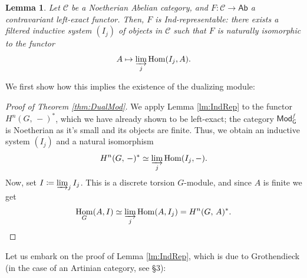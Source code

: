 \documentclass[a4paper, oneside]{memoir}
\def\Gfmod{\mathsf{Mod}_{\mathsf{G}}^f}
\def\Ab{\mathsf{Ab}}
\renewcommand{\H}[3]{H^{#1}( #2, \, #3 )}
\DeclareMathOperator{\Hom}{Hom}
\theoremstyle{plain}
\newtheorem{lemma}[theorem]{Lemma}
\theoremstyle{definition}
\theoremstyle{remark}
\begin{document}
\begin{lemma}\label{lm:IndRep}
    Let \(\mathcal{C}\) be a Noetherian Abelian category, and \(F: \mathcal{C}\to\Ab\) a contravariant left-exact functor.
    Then, \(F\) is \textup{Ind}-representable: there exists a filtered inductive system \((I_j)\) of objects in \(\mathcal{C}\) such that \(F\) is naturally isomorphic to the functor
    \[A\mapsto \varinjlim_j \Hom(I_j,A).\]
\end{lemma}

We first show how this implies the existence of the dualizing module:

\begin{proof}[Proof of Theorem \eqref{thm:DualMod}]
    We apply Lemma \eqref{lm:IndRep} to the functor \(\H{n}{G}{-}^*\), which we have already shown to be left-exact; the category \(\Gfmod\) is Noetherian as it's small and its objects are finite.
    Thus, we obtain an inductive system \((I_j)\) and a natural isomorphism
    \[
        \H{n}{G}{-}^* \simeq \varinjlim_j \Hom(I_j,-).
    \]
    Now, set \(I\coloneqq \varinjlim_j I_j\). This is a discrete torsion \(G\)-module, and since \(A\) is finite we get
    \[
        \Hom_G(A,I) \simeq \varinjlim_j \Hom(A,I_j) = \H{n}{G}{A}^*.
    \]
\end{proof}

Let us embark on the proof of Lemma \eqref{lm:IndRep}, which is
due to Grothendieck (in the case of an Artinian category, see \cite{Grothendieck} \S 3):
\end{document}
